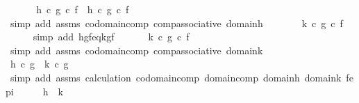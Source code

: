 \begin{isabellebody}
\ \ \isanewline
\ \ \isamarkupfalse%
\ {\isachardoublequoteopen}{\isacharparenleft}{\kern0pt}h\ {\isasymcirc}\isactrlsub c\ g{\isacharparenright}{\kern0pt}\ {\isasymcirc}\isactrlsub c\ f\ {\isacharequal}{\kern0pt}\ h\ {\isasymcirc}\isactrlsub c\ {\isacharparenleft}{\kern0pt}g\ {\isasymcirc}\isactrlsub c\ f{\isacharparenright}{\kern0pt}{\isachardoublequoteclose}\isanewline
\ \ \ \ \isamarkupfalse%
\ {\isacharparenleft}{\kern0pt}simp\ add{\isacharcolon}{\kern0pt}\ assms\ codomain{\isacharunderscore}{\kern0pt}comp\ comp{\isacharunderscore}{\kern0pt}associative\ domain{\isacharunderscore}{\kern0pt}h{\isacharparenright}{\kern0pt}\isanewline
\ \ \isamarkupfalse%
\ \isamarkupfalse%
\ {\isachardoublequoteopen}{\isachardot}{\kern0pt}{\isachardot}{\kern0pt}{\isachardot}{\kern0pt}\ {\isacharequal}{\kern0pt}\ k\ {\isasymcirc}\isactrlsub c\ {\isacharparenleft}{\kern0pt}g\ {\isasymcirc}\isactrlsub c\ f{\isacharparenright}{\kern0pt}{\isachardoublequoteclose}\isanewline
\ \ \ \ \isamarkupfalse%
\ {\isacharparenleft}{\kern0pt}simp\ add{\isacharcolon}{\kern0pt}\ hgf{\isacharunderscore}{\kern0pt}eq{\isacharunderscore}{\kern0pt}kgf{\isacharparenright}{\kern0pt}\isanewline
\ \ \isamarkupfalse%
\ \isamarkupfalse%
\ {\isachardoublequoteopen}{\isachardot}{\kern0pt}{\isachardot}{\kern0pt}{\isachardot}{\kern0pt}\ {\isacharequal}{\kern0pt}{\isacharparenleft}{\kern0pt}k\ {\isasymcirc}\isactrlsub c\ g{\isacharparenright}{\kern0pt}\ {\isasymcirc}\isactrlsub c\ f\ {\isachardoublequoteclose}\isanewline
\ \ \ \ \isamarkupfalse%
\ {\isacharparenleft}{\kern0pt}simp\ add{\isacharcolon}{\kern0pt}\ assms\ codomain{\isacharunderscore}{\kern0pt}comp\ comp{\isacharunderscore}{\kern0pt}associative\ domain{\isacharunderscore}{\kern0pt}k{\isacharparenright}{\kern0pt}\isanewline
\ \isanewline
\ \ \isamarkupfalse%
\ \isamarkupfalse%
\ {\isachardoublequoteopen}h\ {\isasymcirc}\isactrlsub c\ g\ {\isacharequal}{\kern0pt}\ k\ {\isasymcirc}\isactrlsub c\ g{\isachardoublequoteclose}\isanewline
\ \ \ \ \isamarkupfalse%
\ {\isacharparenleft}{\kern0pt}simp\ add{\isacharcolon}{\kern0pt}\ assms\ calculation\ codomain{\isacharunderscore}{\kern0pt}comp\ domain{\isacharunderscore}{\kern0pt}comp\ domain{\isacharunderscore}{\kern0pt}h\ domain{\isacharunderscore}{\kern0pt}k\ f{\isacharunderscore}{\kern0pt}epi{\isacharparenright}{\kern0pt}\isanewline
\ \ \isamarkupfalse%
\ \isamarkupfalse%
\ {\isachardoublequoteopen}h\ {\isacharequal}{\kern0pt}\ k{\isachardoublequoteclose}\isanewline

\end{isabellebody}
